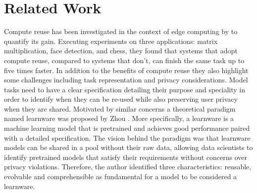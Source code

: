\documentclass{mpaper}
\begin{document}


\section{Related Work}

Compute reuse has been investigated in the context of edge computing by \cite{ComputeReuse} to quantify its gain. Executing experiments on three applications: matrix multiplication, face detection, and chess, they found that systems that adopt compute reuse, compared to systems that don't, can finish the same task up to five times faster. In addition to the benefits of compute reuse they also highlight some challenges including task representation and privacy considerations. Model tasks need to have a clear specification detailing their purpose and speciality in order to identify when they can be re-used while also preserving user privacy when they are shared. Motivated by similar concerns a theoretical paradigm named learnware was proposed by Zhou \cite{Learnware}. More specifically, a learnware is a machine learning model that is pretrained and achieves good performance paired with a detailed specification. The vision behind the paradigm was that learnware models can be shared in a pool without their raw data, allowing data scientists to identify pretrained models that satisfy their requirements without concerns over privacy violations. Therefore, the author identified three characteristics: reusable, evolvable and comprehensible as fundamental for a model to be considered a learnware.  
\end{document}
